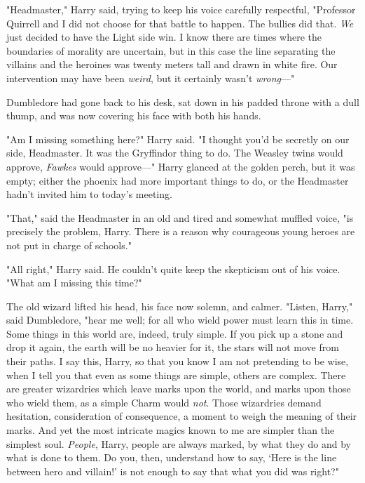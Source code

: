 "Headmaster," Harry said, trying to keep his voice carefully respectful,
"Professor Quirrell and I did not choose for that battle to happen. The bullies
did that. \emph{We} just decided to have the Light side win. I know there are
times where the boundaries of morality are uncertain, but in this case the line
separating the villains and the heroines was twenty meters tall and drawn in
white fire. Our intervention may have been \emph{weird}, but it certainly
wasn't \emph{wrong}—"

Dumbledore had gone back to his desk, sat down in his padded throne with a dull
thump, and was now covering his face with both his hands.

"Am I missing something here?" Harry said. "I thought you'd be secretly on our
side, Headmaster. It was the Gryffindor thing to do. The Weasley twins would
approve, \emph{Fawkes} would approve—" Harry glanced at the golden perch, but
it was empty; either the phoenix had more important things to do, or the
Headmaster hadn't invited him to today's meeting.

"That," said the Headmaster in an old and tired and somewhat muffled voice, "is
precisely the problem, Harry. There is a reason why courageous young heroes are
not put in charge of schools."

"All right," Harry said. He couldn't quite keep the skepticism out of his
voice. "What am I missing this time?"

The old wizard lifted his head, his face now solemn, and calmer. "Listen,
Harry," said Dumbledore, "hear me well; for all who wield power must learn this
in time. Some things in this world are, indeed, truly simple. If you pick up a
stone and drop it again, the earth will be no heavier for it, the stars will
not move from their paths. I say this, Harry, so that you know I am not
pretending to be wise, when I tell you that even as some things are simple,
others are complex. There are greater wizardries which leave marks upon the
world, and marks upon those who wield them, as a simple Charm would \emph{not}.
Those wizardries demand hesitation, consideration of consequence, a moment to
weigh the meaning of their marks. And yet the most intricate magics known to me
are simpler than the simplest soul. \emph{People}, Harry, people are always
marked, by what they do and by what is done to them. Do you, then, understand
how to say, `Here is the line between hero and villain!' is not enough to say
that what you did was right?"

